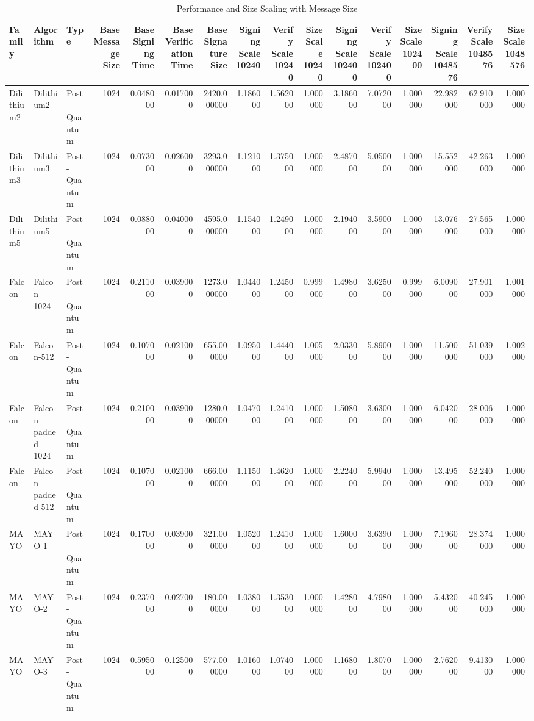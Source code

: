 \begin{table}
\caption{Performance and Size Scaling with Message Size}
\label{tab:msg_size_scaling}
\begin{tabular}{lllrrrrrrrrrrrrr}
\toprule
Family & Algorithm & Type & Base Message Size & Base Signing Time & Base Verification Time & Base Signature Size & Signing Scale 10240 & Verify Scale 10240 & Size Scale 10240 & Signing Scale 102400 & Verify Scale 102400 & Size Scale 102400 & Signing Scale 1048576 & Verify Scale 1048576 & Size Scale 1048576 \\
\midrule
Dilithium2 & Dilithium2 & Post-Quantum & 1024 & 0.048000 & 0.017000 & 2420.000000 & 1.186000 & 1.562000 & 1.000000 & 3.186000 & 7.072000 & 1.000000 & 22.982000 & 62.910000 & 1.000000 \\
Dilithium3 & Dilithium3 & Post-Quantum & 1024 & 0.073000 & 0.026000 & 3293.000000 & 1.121000 & 1.375000 & 1.000000 & 2.487000 & 5.050000 & 1.000000 & 15.552000 & 42.263000 & 1.000000 \\
Dilithium5 & Dilithium5 & Post-Quantum & 1024 & 0.088000 & 0.040000 & 4595.000000 & 1.154000 & 1.249000 & 1.000000 & 2.194000 & 3.590000 & 1.000000 & 13.076000 & 27.565000 & 1.000000 \\
Falcon & Falcon-1024 & Post-Quantum & 1024 & 0.211000 & 0.039000 & 1273.000000 & 1.044000 & 1.245000 & 0.999000 & 1.498000 & 3.625000 & 0.999000 & 6.009000 & 27.901000 & 1.001000 \\
Falcon & Falcon-512 & Post-Quantum & 1024 & 0.107000 & 0.021000 & 655.000000 & 1.095000 & 1.444000 & 1.005000 & 2.033000 & 5.890000 & 1.000000 & 11.500000 & 51.039000 & 1.002000 \\
Falcon & Falcon-padded-1024 & Post-Quantum & 1024 & 0.210000 & 0.039000 & 1280.000000 & 1.047000 & 1.241000 & 1.000000 & 1.508000 & 3.630000 & 1.000000 & 6.042000 & 28.006000 & 1.000000 \\
Falcon & Falcon-padded-512 & Post-Quantum & 1024 & 0.107000 & 0.021000 & 666.000000 & 1.115000 & 1.462000 & 1.000000 & 2.224000 & 5.994000 & 1.000000 & 13.495000 & 52.240000 & 1.000000 \\
MAYO & MAYO-1 & Post-Quantum & 1024 & 0.170000 & 0.039000 & 321.000000 & 1.052000 & 1.241000 & 1.000000 & 1.600000 & 3.639000 & 1.000000 & 7.196000 & 28.374000 & 1.000000 \\
MAYO & MAYO-2 & Post-Quantum & 1024 & 0.237000 & 0.027000 & 180.000000 & 1.038000 & 1.353000 & 1.000000 & 1.428000 & 4.798000 & 1.000000 & 5.432000 & 40.245000 & 1.000000 \\
MAYO & MAYO-3 & Post-Quantum & 1024 & 0.595000 & 0.125000 & 577.000000 & 1.016000 & 1.074000 & 1.000000 & 1.168000 & 1.807000 & 1.000000 & 2.762000 & 9.413000 & 1.000000 \\

\end{tabular}
\end{table}
